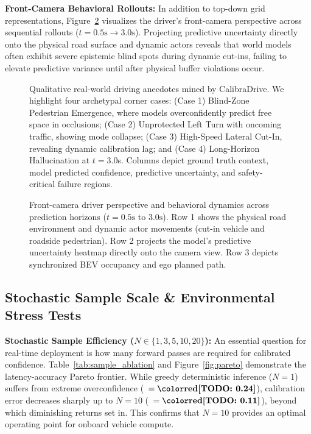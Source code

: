 \textbf{Front-Camera Behavioral Rollouts:} In addition to top-down grid representations, Figure~\ref{fig:camera_behavior} visualizes the driver's front-camera perspective across sequential rollouts ($t=0.5\text{s} \to 3.0\text{s}$). Projecting predictive uncertainty directly onto the physical road surface and dynamic actors reveals that world models often exhibit severe epistemic blind spots during dynamic cut-ins, failing to elevate predictive variance until after physical buffer violations occur.

\begin{figure}[t]
\centering
\caption{Qualitative real-world driving anecdotes mined by CalibraDrive. We highlight four archetypal corner cases: (Case 1) Blind-Zone Pedestrian Emergence, where models overconfidently predict free space in occlusions; (Case 2) Unprotected Left Turn with oncoming traffic, showing mode collapse; (Case 3) High-Speed Lateral Cut-In, revealing dynamic calibration lag; and (Case 4) Long-Horizon Hallucination at $t=3.0$s. Columns depict ground truth context, model predicted confidence, predictive uncertainty, and safety-critical failure regions.}
\label{fig:anecdotes}
\end{figure}

\begin{figure}[t]
\centering
\caption{Front-camera driver perspective and behavioral dynamics across prediction horizons ($t=0.5\text{s}$ to $3.0\text{s}$). Row 1 shows the physical road environment and dynamic actor movements (cut-in vehicle and roadside pedestrian). Row 2 projects the model's predictive uncertainty heatmap directly onto the camera view. Row 3 depicts synchronized BEV occupancy and ego planned path.}
\label{fig:camera_behavior}
\end{figure}

\subsection{Stochastic Sample Scale \& Environmental Stress Tests}
\label{sec:ablations}
\textbf{Stochastic Sample Efficiency ($N \in \{1, 3, 5, 10, 20\}$):} An essential question for real-time deployment is how many forward passes are required for calibrated confidence. Table~\ref{tab:sample_ablation} and Figure~\ref{fig:pareto} demonstrate the latency-accuracy Pareto frontier. While greedy deterministic inference ($N=1$) suffers from extreme overconfidence (\ece~$= \TODO{0.24}$), calibration error decreases sharply up to $N=10$ (\ece~$= \TODO{0.11}$), beyond which diminishing returns set in. This confirms that $N=10$ provides an optimal operating point for onboard vehicle compute.


